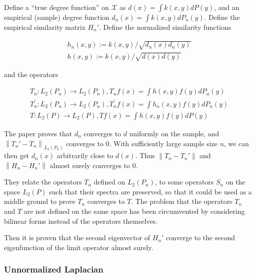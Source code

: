 {	Define a ``true degree function'' on $\mathcal{X}$ as $d(x)=\int k(x, y) d P(y)$, and an empirical (sample) degree function $d_n(x)=\int k(x, y) d P_{n}(y)$. Define the empirical similarity matrix $H_n'$. Define the normalized similarity functions
	
	\begin{equation}
		\begin{split}
			h_{n}(x, y):=k(x, y) / \sqrt{d_{n}(x) d_{n}(y)} \\
			h(x, y):=k(x, y) / \sqrt{d(x) d(y)}
		\end{split}
	\end{equation}
	
	and the operators
	
	\begin{equation}
		\begin{split}
			T_{n}: L_{2}\left(P_{n}\right) \rightarrow L_{2}\left(P_{n}\right), T_{n} f(x)=\int h(x, y) f(y) d P_{n}(y) \\
			T_{n}^{\prime}: L_{2}\left(P_{n}\right) \rightarrow L_{2}\left(P_{n}\right), T_{n}^{\prime} f(x)=\int h_{n}(x, y) f(y) d P_{n}(y) \\
			T: L_{2}(P) \rightarrow L_{2}(P), T f(x)=\int h(x, y) f(y) d P(y)
		\end{split}
	\end{equation}
	
	The paper proves that $d_n$ converges to $d$ uniformly on the sample, and $\left\|T_n'-T_n\right\|_{L_{2}\left(P_{n}\right)}$ converges to 0. With sufficiently large sample size $n$, we can then get $d_n(x)$ arbitrarily close to $d(x)$. Thus $\left\|T_{n}-T_{n}'\right\|$ and $\left\|H_{n}-H_{n}'\right\|$ almost surely converges to 0.
	
	They relate the operators $T_n$ defined on $L_2 (P_n)$, to some operators $S_n$ on the space $L_2 (P)$ such that their spectra are preserved, so that it could be used as a middle ground to prove $T_n$ converges to $T$. The problem that the operators $T_n$ and $T$ are not deﬁned on the same space has been circumvented by considering bilinear forms instead of the operators themselves.
	
	Then it is proven that the second eigenvector of $H_n'$ converge to the second eigenfunction of the limit operator almost surely.
	
	\subsubsection{Unnormalized Laplacian}
	
}
